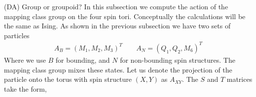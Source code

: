 \documentclass[12pt,a4paper]{article}
\newcounter{arrow}
\newcommand{\dave}[1]{{\color{ao(english)}\footnotesize{(DA) #1}}}
\begin{document}
\dave{Group or groupoid?}
In this subsection we compute the action of the mapping class group on the four spin tori. 
Conceptually the calculations will be the same as Ising.
As shown in the previous subsection we have two sets of particles
\begin{align}
A_B = (M_1, M_2, M_3)^{T} \quad \quad A_N = (Q_1, Q_2, M_6)^{T}
\end{align}
Where we use $B$ for bounding, and $N$ for non-bounding spin structures.
The mapping class group mixes these states. 
Let us denote the projection of the particle onto the torus with spin structure $(X,Y)$ as $A_{XY}$.
The $S$ and $T$ matrices take the form,
\end{document}
